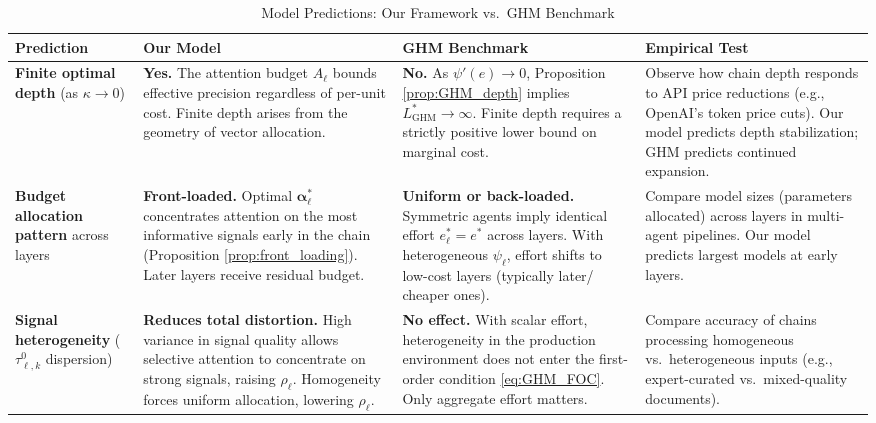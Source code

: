 
\begin{table}[htbp]
\centering
\caption{Model Predictions: Our Framework vs.~GHM Benchmark}
\label{tab:prediction_comparison}
\small
\begin{tabular}{@{}p{4.2cm}p{3.8cm}p{3.8cm}p{4.0cm}@{}}
\toprule
\textbf{Prediction} & \textbf{Our Model} & \textbf{GHM Benchmark} & \textbf{Empirical Test} \\
\midrule
\addlinespace
\textbf{Finite optimal depth} (as $\kappa \to 0$) &
\textbf{Yes.} The attention budget $A_\ell$ bounds effective precision regardless of per-unit cost. Finite depth arises from the geometry of vector allocation. &
\textbf{No.} As $\psi'(e) \to 0$, Proposition \ref{prop:GHM_depth} implies $L^*_{\text{GHM}} \to \infty$. Finite depth requires a strictly positive lower bound on marginal cost. &
Observe how chain depth responds to API price reductions (e.g., OpenAI's token price cuts). Our model predicts depth stabilization; GHM predicts continued expansion. \\
\addlinespace
\midrule
\addlinespace
\textbf{Budget allocation pattern} across layers &
\textbf{Front-loaded.} Optimal $\boldsymbol{\alpha}^*_\ell$ concentrates attention on the most informative signals early in the chain (Proposition \ref{prop:front_loading}). Later layers receive residual budget. &
\textbf{Uniform or back-loaded.} Symmetric agents imply identical effort $e^*_\ell = e^*$ across layers. With heterogeneous $\psi_\ell$, effort shifts to low-cost layers (typically later/ cheaper ones). &
Compare model sizes (parameters allocated) across layers in multi-agent pipelines. Our model predicts largest models at early layers. \\
\addlinespace
\midrule
\addlinespace
\textbf{Signal heterogeneity} ($\tau^0_{\ell,k}$ dispersion) &
\textbf{Reduces total distortion.} High variance in signal quality allows selective attention to concentrate on strong signals, raising $\rho_\ell$. Homogeneity forces uniform allocation, lowering $\rho_\ell$. &
\textbf{No effect.} With scalar effort, heterogeneity in the production environment does not enter the first-order condition \eqref{eq:GHM_FOC}. Only aggregate effort matters. &
Compare accuracy of chains processing homogeneous vs.~heterogeneous inputs (e.g., expert-curated vs.~mixed-quality documents). \\

\end{tabular}
\end{table}
